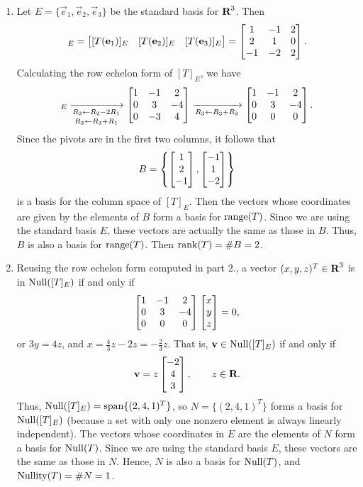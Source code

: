 \documentclass{homework}
\begin{document}
\begin{enumerate}
		\item Let $E = \{\vec{e}_1, \vec{e}_2, \vec{e}_3\}$ be the standard basis for $\textnormal{\bf R}^3$. Then
		\begin{equation*}
			[T]_E = \mat{[T(\vec{e}_1)]_E & [T(\vec{e}_2)]_E & [T(\vec{e}_3)]_E} = \mat{1 & - 1 & 2 \\ 2 & 1 & 0 \\ -1 & -2 & 2}.
		\end{equation*}
		Calculating the row echelon form of $[T]_E$, we have
		\begin{equation*}
			[T]_E \xrightarrow[\substack{R_2 \gets R_2 - 2R_1 \\[0.25em] R_3 \gets R_3 + R_1}]{} \mat{1 & -1 & 2 \\ 0 & 3 & -4 \\ 0 & -3 & 4} \xrightarrow[R_3 \gets R_3 + R_2]{} \mat{1 & -1 & 2 \\ 0 & 3 & -4 \\ 0 & 0 & 0}.
		\end{equation*}
		Since the pivots are in the first two columns, it follows that
		\begin{equation*}
			B = \left\{\left[\begin{matrix}1 \\ 2 \\ -1\end{matrix}\right], \left[\begin{matrix}-1 \\ 1 \\ -2\end{matrix}\right]\right\}
		\end{equation*}
		is a basis for the column space of $[T]_E$. Then the vectors whose coordinates are given by the elements of $B$ form a basis for $\mathrm{range}(T)$. Since we are using the standard basis $E$, these vectors are actually the same as those in $B$. Thus, $B$ is also a basis for $\mathrm{range}(T)$. Then $\mathrm{rank}(T) = \# B = 2$.
		
		\item Reusing the row echelon form computed in part 2., a vector $(x,y,z)^T \in \textnormal{\bf R}^3$ is in $\mathrm{Null}([T]_E)$ if and only if 
		\begin{equation*}
			\left[\begin{matrix}1 & -1 & 2 \\ 0 & 3 & -4 \\ 0 & 0 & 0\end{matrix}\right]\left[\begin{matrix}x\\y\\z\end{matrix}\right] = 0,
		\end{equation*}
		or $3y =4z$, and $x = \frac{4}{3}z - 2z = -\frac{2}{3}z$. That is, $\mathbf{v} \in \mathrm{Null}([T]_E)$ if and only if
		\begin{equation*}
			\mathbf{v} = z\left[\begin{matrix}-2 \\ 4 \\ 3\end{matrix}\right], \qquad z \in \textnormal{\bf R}.
		\end{equation*}
		Thus, $\mathrm{Null}([T]_E) = \mathrm{span}\{(2,4,1)^T\}$, so $N = \{(2,4,1)^T\}$ forms a basis for $\mathrm{Null}([T]_E)$ (because a set with only one nonzero element is always linearly independent). The vectors whose coordinates in $E$ are the elements of $N$ form a basis for $\mathrm{Null}(T)$. Since we are using the standard basis $E$, these vectors are the same as those in $N$. Hence, $N$ is also a basis for $\mathrm{Null}(T)$, and $\mathrm{Nullity}(T) = \# N= 1$.
	\end{enumerate}
	
\end{document}
